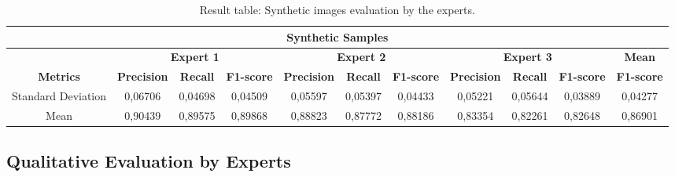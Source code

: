 \documentclass{ieeeaccess}
\begin{document}
\begin{table}[h!]
\centering
\caption{Result table: Synthetic images evaluation by the experts.}
\label{tab:synthetic_images_evaluation}
\begin{tabular}{|c|c|c|c|c|c|c|c|c|c|c|}
\hline
\multicolumn{11}{|c|}{\textbf{Synthetic Samples}} \\
\hline
~ & \multicolumn{3}{c|}{\textbf{Expert 1}} & \multicolumn{3}{c|}{\textbf{Expert 2}} & \multicolumn{3}{c|}{\textbf{Expert 3}} & \textbf{Mean} \\
\cline{2-11}
\textbf{Metrics} & \textbf{Precision} & \textbf{Recall} & \textbf{F1-score} & \textbf{Precision} & \textbf{Recall} & \textbf{F1-score} & \textbf{Precision} & \textbf{Recall} & \textbf{F1-score} & \textbf{F1-score} \\
\hline
Standard Deviation & 0,06706 & 0,04698 & 0,04509 & 0,05597 & 0,05397 & 0,04433 & 0,05221 & 0,05644 & 0,03889 & 0,04277 \\
\hline
Mean & 0,90439 & 0,89575 & 0,89868 & 0,88823 & 0,87772 & 0,88186 & 0,83354 & 0,82261 & 0,82648 & 0,86901 \\
\hline
\end{tabular}
\end{table}



\begin{table}[h!]
\centering
\caption{Statistics for sinthesys group \texttt{0bdd44d530} with 100 images}
\end{table}


\subsection{Qualitative Evaluation by Experts}
\end{document}
